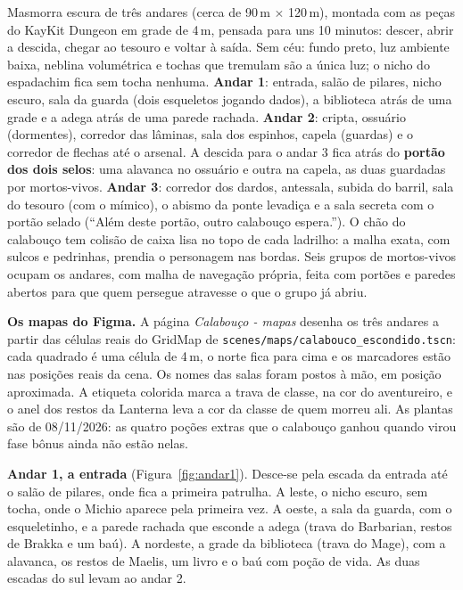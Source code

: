 \documentclass[11pt,a4paper]{article}
\begin{document}
Masmorra escura de três andares (cerca de 90\,m $\times$ 120\,m), montada com as peças do KayKit Dungeon em grade de 4\,m, pensada para uns 10 minutos: descer, abrir a descida, chegar ao tesouro e voltar à saída. Sem céu: fundo preto, luz ambiente baixa, neblina volumétrica e tochas que tremulam são a única luz; o nicho do espadachim fica sem tocha nenhuma. \textbf{Andar 1}: entrada, salão de pilares, nicho escuro, sala da guarda (dois esqueletos jogando dados), a biblioteca atrás de uma grade e a adega atrás de uma parede rachada. \textbf{Andar 2}: cripta, ossuário (dormentes), corredor das lâminas, sala dos espinhos, capela (guardas) e o corredor de flechas até o arsenal. A descida para o andar 3 fica atrás do \textbf{portão dos dois selos}: uma alavanca no ossuário e outra na capela, as duas guardadas por mortos-vivos. \textbf{Andar 3}: corredor dos dardos, antessala, subida do barril, sala do tesouro (com o mímico), o abismo da ponte levadiça e a sala secreta com o portão selado (``Além deste portão, outro calabouço espera.''). O chão do calabouço tem colisão de caixa lisa no topo de cada ladrilho: a malha exata, com sulcos e pedrinhas, prendia o personagem nas bordas. Seis grupos de mortos-vivos ocupam os andares, com malha de navegação própria, feita com portões e paredes abertos para que quem persegue atravesse o que o grupo já abriu.

\textbf{Os mapas do Figma.} A página \emph{Calabouço - mapas} desenha os três andares a partir das células reais do GridMap de \texttt{scenes/maps/calabouco\_escondido.tscn}: cada quadrado é uma célula de 4\,m, o norte fica para cima e os marcadores estão nas posições reais da cena. Os nomes das salas foram postos à mão, em posição aproximada. A etiqueta colorida marca a trava de classe, na cor do aventureiro, e o anel dos restos da Lanterna leva a cor da classe de quem morreu ali. As plantas são de 08/11/2026: as quatro poções extras que o calabouço ganhou quando virou fase bônus ainda não estão nelas.

\textbf{Andar 1, a entrada} (Figura~\ref{fig:andar1}). Desce-se pela escada da entrada até o salão de pilares, onde fica a primeira patrulha. A leste, o nicho escuro, sem tocha, onde o Michio aparece pela primeira vez. A oeste, a sala da guarda, com o esqueletinho, e a parede rachada que esconde a adega (trava do Barbarian, restos de Brakka e um baú). A nordeste, a grade da biblioteca (trava do Mage), com a alavanca, os restos de Maelis, um livro e o baú com poção de vida. As duas escadas do sul levam ao andar 2.
\end{document}
